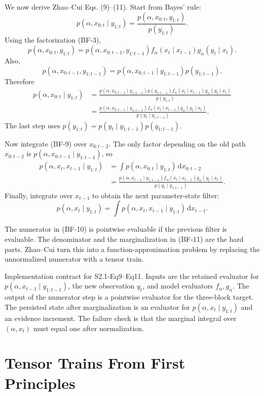 \documentclass[11pt]{article}
\newcommand{\dd}{\,\mathrm d}
\begin{document}
We now derive Zhao--Cui Eqs. (9)--(11).  Start from Bayes' rule:
\[
 p(\alpha,x_{0:t}\mid y_{1:t})
 =
 \frac{p(\alpha,x_{0:t},y_{1:t})}{p(y_{1:t})}.
\]
Using the factorization (BF-3),
\[
 p(\alpha,x_{0:t},y_{1:t})
 =
 p(\alpha,x_{0:t-1},y_{1:t-1})
 f_\alpha(x_t\mid x_{t-1})g_\alpha(y_t\mid x_t).
\]
Also,
\[
 p(\alpha,x_{0:t-1},y_{1:t-1})
 =
 p(\alpha,x_{0:t-1}\mid y_{1:t-1})p(y_{1:t-1}).
\]
Therefore
\[
\begin{aligned}
 p(\alpha,x_{0:t}\mid y_{1:t})
 &=
 \frac{
 p(\alpha,x_{0:t-1}\mid y_{1:t-1})p(y_{1:t-1})
 f_\alpha(x_t\mid x_{t-1})g_\alpha(y_t\mid x_t)}
 {p(y_{1:t})}\\
 &=
 \frac{
 p(\alpha,x_{0:t-1}\mid y_{1:t-1})
 f_\alpha(x_t\mid x_{t-1})g_\alpha(y_t\mid x_t)}
 {p(y_t\mid y_{1:t-1})}.
\end{aligned}
\tag{BF-9}
\]
The last step uses \(p(y_{1:t})=p(y_t\mid y_{1:t-1})p(y_{1:t-1})\).

Now integrate (BF-9) over \(x_{0:t-2}\).  The only factor depending on the old
path \(x_{0:t-2}\) is
\(p(\alpha,x_{0:t-1}\mid y_{1:t-1})\), so
\[
\begin{aligned}
 p(\alpha,x_t,x_{t-1}\mid y_{1:t})
 &=
 \int p(\alpha,x_{0:t}\mid y_{1:t})\dd x_{0:t-2}\\
 &=
 \frac{
 p(\alpha,x_{t-1}\mid y_{1:t-1})
 f_\alpha(x_t\mid x_{t-1})g_\alpha(y_t\mid x_t)}
 {p(y_t\mid y_{1:t-1})}.
\end{aligned}
\tag{BF-10}
\]
Finally, integrate over \(x_{t-1}\) to obtain the next parameter-state filter:
\[
    p(\alpha,x_t\mid y_{1:t})
    =
    \int p(\alpha,x_t,x_{t-1}\mid y_{1:t})\dd x_{t-1}.
    \tag{BF-11}
\]

The numerator in (BF-10) is pointwise evaluable if the previous filter is
evaluable.  The denominator and the marginalization in (BF-11) are the hard
parts.  Zhao--Cui turn this into a function-approximation problem by replacing
the unnormalized numerator with a tensor train.

Implementation contract for S2.1-Eq9--Eq11.  Inputs are the retained evaluator
for \(p(\alpha,x_{t-1}\mid y_{1:t-1})\), the new observation \(y_t\), and model
evaluators \(f_\alpha,g_\alpha\).  The output of the numerator step is a
pointwise evaluator for the three-block target.  The persisted state after
marginalization is an evaluator for \(p(\alpha,x_t\mid y_{1:t})\) and an
evidence increment.  The failure check is that the marginal integral over
\((\alpha,x_t)\) must equal one after normalization.

\section{Tensor Trains From First Principles}
\end{document}
